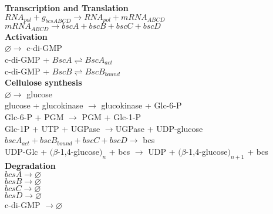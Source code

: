 \documentclass[11pt, oneside]{article}   	%
\begin{document}
\begin{center}
\textbf{Transcription and Translation} \\
$RNA_{pol} + g_{bcsABCD} \rightarrow RNA_{pol} + mRNA_{ABCD}$ \\
$mRNA_{ABCD} \rightarrow bscA + bscB + bscC + bscD$ \\
\hfill \break
\textbf{Activation} \\
$\varnothing \rightarrow$ c-di-GMP \\
c-di-GMP + $BscA \rightleftharpoons BscA_{act}$ \\
c-di-GMP + $BscB \rightleftharpoons BscB_{bound}$ \\
\hfill \break
\textbf{Cellulose synthesis} \\
$\varnothing \rightarrow$ glucose \\
glucose + glucokinase $\rightarrow$ glucokinase + Glc-6-P \\
Glc-6-P + PGM $\rightarrow$ PGM + Glc-1-P \\
Glc-1P + UTP + UGPase $\rightarrow$UGPase + UDP-glucose\\
$bscA_{act} + bscB_{bound} + bscC + bscD \rightarrow$ bcs \\
UDP-Glc + $(\beta$-1,4-glucose$)_n$ + bcs $\rightarrow$ UDP + $(\beta$-1,4-glucose$)_{n+1} $  + bcs \\
\hfill \break
\textbf{Degradation} \\
$bcsA \rightarrow \varnothing$ \\
$bcsB \rightarrow \varnothing$ \\
$bcsC \rightarrow \varnothing$ \\
$bcsD \rightarrow \varnothing$ \\
c-di-GMP $ \rightarrow \varnothing$ \\


\end{center}
\end{document}
